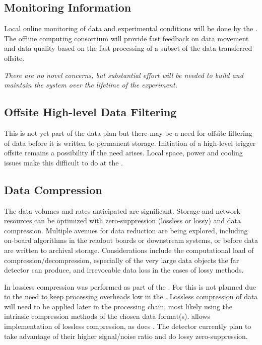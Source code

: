 \documentclass[../main-v1.tex]{subfiles}
\begin{document}
\subsection{Monitoring Information} 
Local online monitoring of data and experimental conditions will be done by the . %
The offline computing consortium will provide fast feedback on data movement and data quality based on the fast processing of a subset of the data transferred offsite. %

{\it There are no novel concerns, but substantial effort will be needed to build and maintain the system over the lifetime of the experiment.}


\subsection{Offsite High-level Data Filtering}

This is not yet part of the data plan but there may be a need for offsite filtering of data before %
it is written to permanent storage. 
 Initiation of a high-level trigger offsite remains a possibility if the need arises. Local space, power and cooling issues make this difficult to do at the .

\subsection{Data Compression}
The data volumes and rates anticipated are significant. Storage and network resources can be optimized with zero-suppression (lossless or lossy) and data compression. Multiple avenues for data reduction are being explored, including on-board algorithms in the readout boards or downstream  systems, or before data are written to archival storage.  Considerations include the computational load of compression/decompression, especially of the very large data objects the far detector can produce, and irrevocable data loss in the cases of lossy methods.

In  lossless compression was performed as part of the . For  this is not planned due to the need to keep processing overheads low in the . Lossless compression of   data will need to be applied later in the processing chain, most likely using the intrinsic compression methods of the chosen data format(s).   allows implementation of lossless compression, as does .  The  detector currently plan to take advantage of their higher signal/noise ratio and do lossy zero-suppression. 
\end{document}
